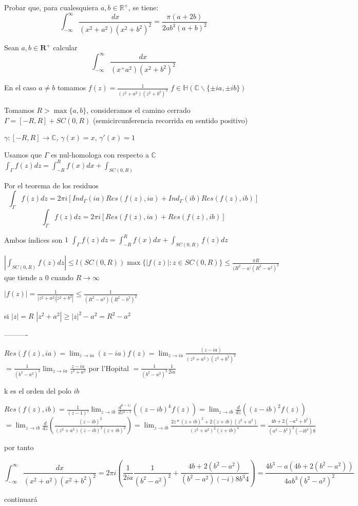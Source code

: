 \begin{ejer}
	Probar que, para cualesquiera $a,b\in\mathbb{R}^+$, se tiene:
	$$ \int_{-\infty}^{\infty} \frac{dx}{(x^2+a^2)(x^2+b^2)^2} = \frac{\pi (a+2b)}{2ab^3(a+b)^2} $$
\end{ejer}
\begin{sol}
Sean $a,b\in\mathbf{R}^+$ calcular
$$ \int_{-\infty}^{\infty} \frac{dx}{(x^+a^2)(x^2+b^2)^2} $$


En el caso $a\not = b$ tomamos $f(z) = \frac{1}{(z^2+a^2)(z^2+b^2)^2}$
$f\in\mathbb{H}( \mathbb{C}\backslash\{ \pm ia, \pm ib \} )$

Tomamos $R>\max\{a,b\}$, consideramos el camino cerrado $\Gamma = [-R,R]+SC(0,R)$ (semicircunferencia recorrida en sentido positivo)

$\gamma : [-R,R]\rightarrow \mathbb{C}$, $\gamma(x)=x$, $\gamma '(x) = 1$

Usamos que $\Gamma$ es nul-homologa con respecto a $\mathbb{C}$
$\int_{\Gamma}f(z)dz = \int_{-R}^{R} f(x)dx + \int_{SC(0,R)}$

Por el teorema de los residuos 
$$\int_{\Gamma}f(z)dz = 2\pi i [ Ind_{\Gamma}(ia)Res(f(z),ia) + Ind_{\Gamma}(ib)Res(f(z),ib) ]$$
$$\int_{\Gamma}f(z)dz = 2\pi i [Res(f(z),ia) + Res(f(z),ib) ]$$

Ambos índices son $1$
$\int_{\Gamma}f(z)dz = \int_{-R}^{R} f(x)dx + \int_{SC(0,R)} f(z)dz$


$|\int_{SC(0,R)} f(z)dz| \leq l(SC(0,R))\max \{ |f(z)| : z\in SC(0,R) \} \leq \frac{\pi R}{(R^2-a^)(R^2-a^2)^2}$
que tiende a $0$ cuando $R\rightarrow \infty$

$|f(z)| = \frac{1}{|z^2+a^2||z^2+b^2|} \leq \frac{1}{(R^2-a^2)(R^2-b^2)^2}$

si $|z|=R$
$|z^2+a^2| \geq |z|^2 -a^2 = R^2-a^2$

----------

$Res(f(z),ia) = \lim_{z\rightarrow ia} (z-ia)f(z) = \lim_{z\rightarrow ia} \frac{(z-ia)}{(z^2+a^2)(z^2+b^2)^2} $
$= \frac{1}{(b^2-a^2)^2} \lim_{z\rightarrow ia} \frac{z-ia}{z^2+a^2}$ 
por l'Hopital
$= \frac{1}{(b^2-a^2)^2}\frac{1}{2ia}$

k es el orden del polo $ib$

$Res(f(z),ib) = \frac{1}{(z-1)'} \lim_{z\rightarrow ib} \frac{d^{k-1)}}{dz^{k-1}} ((z-ib)^k f(z)) = \lim_{z\rightarrow ib} \frac{d}{dz} ((z-ib)^2 f(z)) $
$= \lim_{z\rightarrow ib} \frac{d}{dz} \left( \frac{(z-ib)^2}{(z^2+a^2)(z-ib)^2(z+ib)^2}  \right) 
= \lim_{z\rightarrow ib}\frac{2z*(z+ib)^2 + 2(z+ib)(z^2+a^2)}{(z^2+a^2)^2 (z+ib)^4}
= \frac{4b + 2(-a^2+b^2)}{(a^2-b^2)^2 (-ib^3)8}  $

por tanto

$$ \int_{-\infty}^{\infty} \frac{dx}{(x^2+a^2)(x^2+b^2)^2} = 
2\pi i \left( \frac{1}{2ia}\frac{1}{(b^2-a^2)^2} + \frac{4b+2(b^2-a^2)}{(b^2-a^2)(-i)8b^3 4} \right) =
\frac{4b^3-a(4b+2(b^2-a^2))}{4ab^3(b^2-a^2)^2}$$

continuará

\end{sol}


